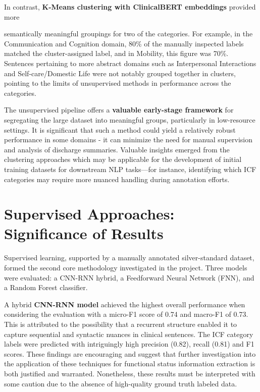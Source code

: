 In contrast, \textbf{K-Means clustering with ClinicalBERT embeddings} provided more

semantically meaningful groupings for two of the categories. For example, in the
Communication and Cognition domain, 80\% of the manually inspected labels matched the cluster-assigned label, and in Mobility, this figure was 70\%. Sentences pertaining to more abstract domains such as Interpersonal Interactions and Self-care/Domestic Life were not notably grouped together in clusters, pointing to the limits of unsupervised methods in performance across the categories.
\medskip

The unsupervised pipeline offers a \textbf{valuable early-stage framework} for segregating the large dataset into meaningful groups, particularly in low-resource settings. It is significant that such a method could yield a relatively robust performance in some domains - it can minimize the need for manual supervision and analysis of discharge summaries. Valuable insights emerged from the clustering approaches which may be applicable for the development of initial training datasets for downstream NLP tasks—for instance, identifying which ICF categories may require more nuanced handling during annotation efforts. 

\section{Supervised Approaches: Significance of Results}

Supervised learning, supported by a manually annotated silver-standard dataset, formed the second core methodology investigated in the project. Three models were evaluated: a CNN-RNN hybrid, a Feedforward Neural Network (FNN), and a Random Forest classifier.
\medskip

A hybrid \textbf{CNN-RNN model} achieved the highest overall performance when considering the evaluation with a micro-F1 score of 0.74 and macro-F1 of 0.73. This is attributed to the possibility that a recurrent structure enabled it to capture sequential and syntactic nuances in clinical sentences. The ICF category labels were predicted with intriguingly high precision (0.82), recall (0.81) and F1 scores. These findings are encouraging and suggest that further investigation into the application of these techniques for functional status information extraction is both justified and warranted. Nonetheless, these results must be interpreted with some caution due to the absence of high-quality ground truth labeled data.
\medskip

